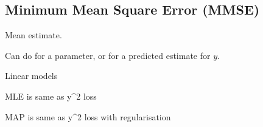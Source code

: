 
\subsection{Minimum Mean Square Error (MMSE)}

Mean estimate.

Can do for a parameter, or for a predicted estimate for \(y\).

Linear models

MLE is same as y^2 loss

MAP is same as y^2 loss with regularisation

